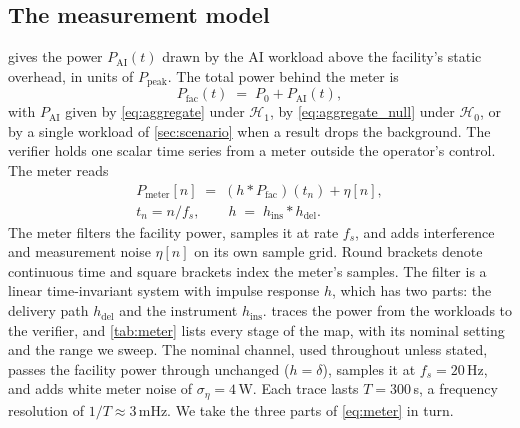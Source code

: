 \documentclass{article}
\begin{document}
\subsection{The measurement model}
\label{subsec:channel}
\label{subsec:obsmap}

 gives the power $P_{\mathrm{AI}}(t)$ drawn by the AI
workload above the facility's static overhead, in units of
$P_{\mathrm{peak}}$. The total power behind the meter is
\begin{equation}
	P_{\mathrm{fac}}(t) \;=\; P_0 + P_{\mathrm{AI}}(t),
	\label{eq:fac}
\end{equation}
with $P_{\mathrm{AI}}$ given by \cref{eq:aggregate} under $\mathcal{H}_1$, by
\cref{eq:aggregate_null} under $\mathcal{H}_0$, or by a single workload of
\cref{sec:scenario} when a result drops the background. The verifier holds one scalar time series from a meter outside the operator's
control. The meter reads
\begin{equation}
	\begin{gathered}
		P_{\mathrm{meter}}[n] \;=\; (h * P_{\mathrm{fac}})(t_n) + \eta[n],\\
		t_n = n/f_s, \qquad h \;=\; h_{\mathrm{ins}} * h_{\mathrm{del}}.
	\end{gathered}
	\label{eq:meter}
\end{equation}
The meter filters the facility power, samples it at rate $f_s$, and adds
interference and measurement noise $\eta[n]$ on its own sample grid. Round
brackets denote continuous time and square brackets index the meter's
samples. The filter is a linear time-invariant system with impulse response $h$, which has
two parts: the delivery path $h_{\mathrm{del}}$ and the instrument
$h_{\mathrm{ins}}$.  traces the power from the workloads
to the verifier, and \cref{tab:meter} lists every stage of the map, with its
nominal setting and the range we sweep. The nominal channel, used throughout
unless stated, passes the facility power through unchanged ($h = \delta$),
samples it at $f_s = 20$\,Hz, and adds white meter noise of
$\sigma_\eta = 4$\,W. Each trace lasts $T = 300$\,s, a frequency resolution of
$1/T \approx 3$\,mHz. We take the three parts of \cref{eq:meter} in turn.
\end{document}
